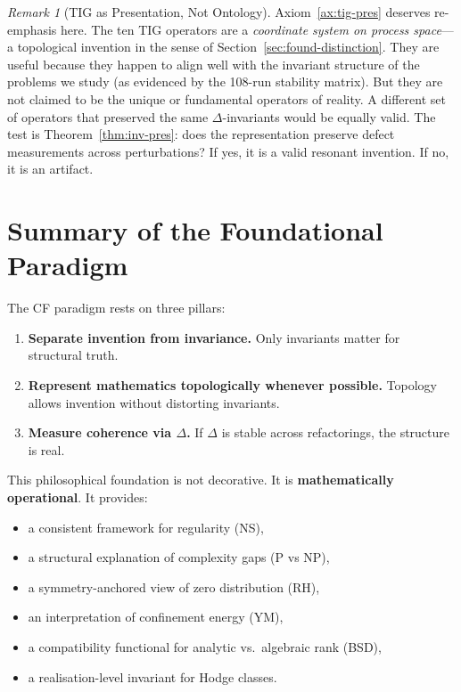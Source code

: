 \documentclass[12pt, openany]{book}
\theoremstyle{remark}
\newtheorem{remark}[theorem]{Remark}
\begin{document}
\begin{remark}[TIG as Presentation, Not Ontology]
Axiom~\ref{ax:tig-pres} deserves re-emphasis here. The ten TIG operators are a
\emph{coordinate system on process space}---a topological invention in the sense
of Section~\ref{sec:found-distinction}. They are useful because they happen to
align well with the invariant structure of the problems we study (as evidenced by
the 108-run stability matrix). But they are not claimed to be the unique or
fundamental operators of reality. A different set of operators that preserved
the same $\Delta$-invariants would be equally valid. The test is
Theorem~\ref{thm:inv-pres}: does the representation preserve defect measurements
across perturbations? If yes, it is a valid resonant invention. If no, it is
an artifact.
\end{remark}

\section{Summary of the Foundational Paradigm}
\label{sec:found-summary}

The CF paradigm rests on three pillars:

\begin{enumerate}
  \item \textbf{Separate invention from invariance.} Only invariants matter for
        structural truth.
  \item \textbf{Represent mathematics topologically whenever possible.} Topology allows
        invention without distorting invariants.
  \item \textbf{Measure coherence via $\Delta$.} If $\Delta$ is stable across
        refactorings, the structure is real.
\end{enumerate}

\noindent
This philosophical foundation is not decorative. It is \textbf{mathematically operational}.
It provides:
\begin{itemize}
  \item a consistent framework for regularity (NS),
  \item a structural explanation of complexity gaps (P vs NP),
  \item a symmetry-anchored view of zero distribution (RH),
  \item an interpretation of confinement energy (YM),
  \item a compatibility functional for analytic vs.\ algebraic rank (BSD),
  \item a realisation-level invariant for Hodge classes.
\end{itemize}
\end{document}
